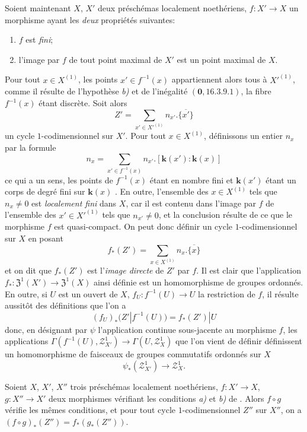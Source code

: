 \begin{env}[21.10.14]
Soient maintenant $X$, $X'$ deux préschémas localement noethériens, $f:X'\to X$ un morphisme ayant les \emph{deux} propriétés suivantes:
\begin{enumerate}[label=\emph{\alph*)}]
  \item $f$ est \emph{fini};
  \item l'image par $f$ de tout point maximal de $X'$ est un point maximal de $X$.
\end{enumerate}

Pour tout $x\in X^{(1)}$, les points $x'\in f^{-1}(x)$ appartiennent alors tous à $X'^{(1)}$, comme il résulte de l'hypothèse \emph{b)} et de l'inégalité $(\mathbf{0},16.3.9.1)$, la fibre $f^{-1}(x)$ étant discrète.
Soit alors
\[
  Z'=\sum_{x'\in X'^{(1)}}n_{x'}.\overline{\{x'\}}
\]
un cycle $1$-codimensionnel sur $X'$.
Pour tout $x\in X^{(1)}$, définissons un entier $n_x$ par la formule
\[
  n_x=\sum_{x'\in f^{-1}(x)}n_{x'}.[\boldsymbol{k}(x'): \boldsymbol{k}(x)]
\]
ce qui a un sens, les points de $f^{-1}(x)$ étant en nombre fini et $\boldsymbol{k}(x')$ étant un corps de degré fini sur $\boldsymbol{k}(x)$ .
En outre, l'ensemble des $x\in X^{(1)}$ tels que $n_x\neq0$ est \emph{localement fini} dans $X$, car il est contenu dans l'image par $f$ de l'ensemble des $x'\in X'^{(1)}$ tels que $n_{x'}\neq0$, et la conclusion résulte de ce que le morphisme $f$ est quasi-compact.
On peut donc définir un cycle $1$-codimensionnel sur $X$ en posant
\[
\label{IV.21.10.14.1}
  f_*(Z')=\sum_{x\in X^{(1)}}n_x.\overline{\{x\}}
  \tag{21.10.14.1}
\]
et on dit que $f_*(Z')$ est l'\emph{image directe} de $Z'$ par $f$.
Il est clair que l'application $f_*:\mathfrak{Z}^1(X')\to\mathfrak{Z}^1(X)$ ainsi définie est un homomorphisme de groupes ordonnés.
En outre, si $U$ est un ouvert de $X$, $f_U:f^{-1}(U)\to U$ la restriction de $f$, il résulte aussitôt des définitions que l'on a
\[
\label{IV.21.10.14.2}
  (f_U)_*(Z'|f^{-1}(U))=f_*(Z')|U
  \tag{21.10.14.2}
\]
donc, en désignant par $\psi$ l'application continue sous-jacente au morphisme $f$, les applications $\Gamma(f^{-1}(U),\mathscr{Z}^1_{X'})\to\Gamma(U,\mathscr{Z}^1_X)$ que l'on vient de définir définissent un homomorphisme de faisceaux de groupes commutatifs ordonnés sur $X$
\[
  \psi_*(\mathscr{Z}^1_{X'})\to\mathscr{Z}^1_X.
\]
\end{env}

\begin{proposition}[21.10.15]
\label{IV.21.10.15}
Soient $X$, $X'$, $X''$ trois préschémas localement noethériens, $f:X'\to X$, $g:X''\to X'$ deux morphismes vérifiant les conditions \emph{a)} et \emph{b)} de .
Alors $f\circ g$ vérifie les mêmes conditions, et pour tout cycle $1$-codimensionnel $Z''$ sur $X''$, on a $(f\circ g)_*(Z'')=f_*(g_*(Z''))$.
\end{proposition}

